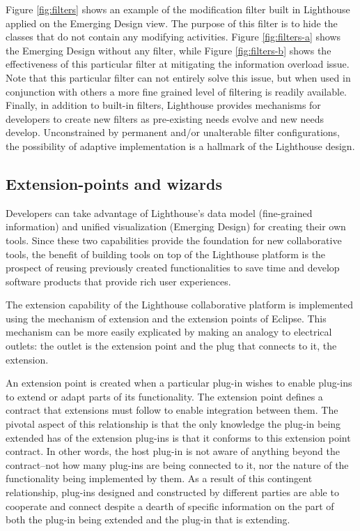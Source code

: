 \documentclass[10pt, conference, compsocconf]{IEEEtran}
\begin{document}
Figure \ref{fig:filters} shows an example of the modification filter built in Lighthouse applied on the Emerging Design view.  The purpose of this filter is to hide the classes that do not contain any modifying activities.  Figure \ref{fig:filters-a} shows the Emerging Design without any filter, while Figure \ref{fig:filters-b} shows the effectiveness of this particular filter at mitigating the information overload issue.  Note that this particular filter can not entirely solve this issue, but when used in conjunction with others a     more fine grained level of filtering is readily available. Finally, in addition to built-in filters, Lighthouse provides mechanisms for developers to create new filters as pre-existing needs evolve and new needs develop.  Unconstrained by permanent and/or unalterable filter configurations, the possibility of adaptive implementation is a hallmark of the Lighthouse design.

\subsection{Extension-points and wizards}

Developers can take advantage of Lighthouse's data model (fine-grained information) and unified visualization (Emerging Design) for creating their own tools. Since these two capabilities provide the foundation for new collaborative tools, the benefit of building tools on top of the Lighthouse platform is the prospect of reusing previously created functionalities to save time and develop software products that provide rich user experiences.

The extension capability of the Lighthouse collaborative platform is implemented using the mechanism of extension and the extension points of Eclipse. This mechanism can be more easily explicated by making an analogy to electrical outlets: the outlet is the extension point and the plug that connects to it, the extension. 

An extension point is created when a particular plug-in wishes to enable plug-ins to extend or adapt parts of its functionality. The extension point defines a contract that extensions must follow to enable integration between them. The pivotal aspect of this relationship is that the only knowledge the plug-in being extended has of the extension plug-ins is that it conforms to this extension point contract. In other words, the host plug-in is not aware of anything beyond the contract--not how many plug-ins are being connected to it, nor the nature of the functionality being implemented by them. As a result of this contingent relationship, plug-ins designed and constructed by different parties are able to cooperate and connect despite a dearth of specific information on the part of both the plug-in being extended and the plug-in that is extending.
\end{document}
